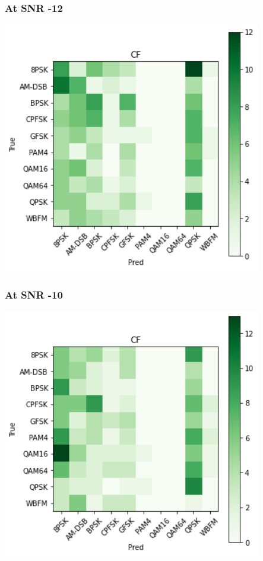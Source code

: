 \documentclass[12pt,a4paper]{article}
\begin{document}
\subsubsection{At SNR -12}
\begin{center}
\includegraphics[width=320pt]{imgs/snrs/snr1.png}
\end{center}

\subsubsection{At SNR -10}
\begin{center}
\includegraphics[width=320pt]{imgs/snrs/snr0.png}
\end{center}
\end{document}
